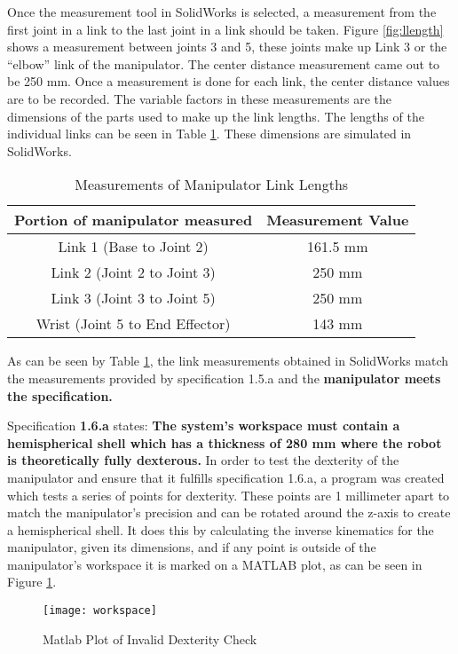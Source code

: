 Once the measurement tool in SolidWorks is selected, a measurement from the first joint in a link to the last joint in a link should be taken. Figure \ref{fig:llength} shows a measurement between joints 3 and 5, these joints make up Link 3 or the “elbow” link of the manipulator. The center distance measurement came out to be 250 mm. Once a measurement is done for each link, the center distance values are to be recorded. The variable factors in these measurements are the dimensions of the parts used to make up the link lengths. The lengths of the individual links can be seen in Table \ref{tab:linklengths}. These dimensions are simulated in SolidWorks.


\begin{table}[htp]
  \centering
  \caption{Measurements of Manipulator Link Lengths}
  \label{tab:linklengths}
  \begin{tabular}{c|c}
    Portion of manipulator measured & Measurement Value \\\hline
    Link 1 (Base to Joint 2) & 161.5 mm \\
    Link 2 (Joint 2 to Joint 3) & 250 mm \\
    Link 3 (Joint 3 to Joint 5) & 250 mm \\
    Wrist (Joint 5 to End Effector) & 143 mm \\
  \end{tabular}
\end{table}

As can be seen by Table \ref{tab:linklengths}, the link measurements obtained in SolidWorks match the measurements provided by specification 1.5.a and the \textbf{manipulator meets the specification. }


Specification \textbf{1.6.a} states: \textbf{The system’s workspace must contain a hemispherical shell which has a thickness of 280 mm where the robot is theoretically fully dexterous.} In order to test the dexterity of the manipulator and ensure that it fulfills specification 1.6.a, a program was created which tests a series of points for dexterity. These points are 1 millimeter apart to match the manipulator’s precision and can be rotated around the z-axis to create a hemispherical shell. It does this by calculating the inverse kinematics for the manipulator, given its dimensions, and if any point is outside of the manipulator’s workspace it is marked on a MATLAB plot, as can be seen in Figure \ref{fig:plot1}.
\let\clearpage\relax
\begin{figure}[htp]
  \centering
  \texttt{[image: workspace]}
  \caption{Matlab Plot of Invalid Dexterity Check}
  \label{fig:plot1}
\end{figure}

